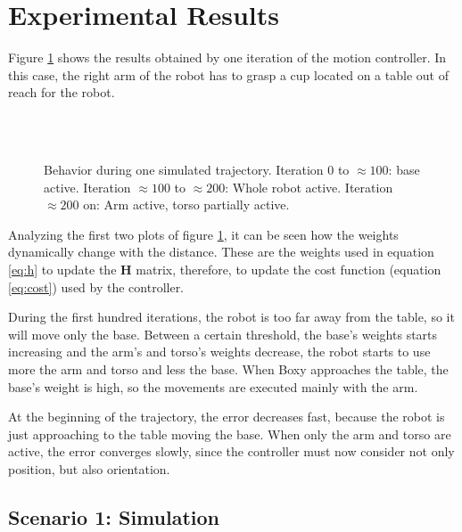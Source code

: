 \section{Experimental Results}

Figure \ref{fig:exp} shows the results obtained by one iteration of the motion controller. In this case, the right arm of the robot has to grasp a cup located on a table out of reach for the robot.

\begin{figure}[H]
	\centering
	 \\ \vspace{-10pt}
	 \\ \vspace{-5pt}
	 \vspace{-8pt}
	 \vspace{-5pt}
	 \vspace{-20pt}
	\caption[Trajectory Result]{Behavior during one simulated trajectory. Iteration $0$ to $\approx100$: base active. Iteration $\approx100$ to $\approx200$: Whole robot active. Iteration $\approx200$ on: Arm active, torso partially active.} \vspace{-15pt} \label{fig:exp}
\end{figure}

Analyzing  the first two plots of figure \ref{fig:exp}, it can be seen how the weights dynamically change with the distance. These are the weights used in equation \ref{eq:h} to update the $\textbf{H}$ matrix, therefore, to update the cost function (equation \ref{eq:cost}) used by the controller. 

During the first hundred iterations, the robot is too far away from the table, so it will move only the base. Between a certain threshold, the base's weights starts increasing and the arm's and torso's weights decrease, the robot starts to use more the arm and torso and less the base. When Boxy approaches the table, the base's weight is high, so the movements are executed mainly with the arm.

At the beginning of the trajectory, the error decreases fast, because the robot is just approaching to the table moving the base. When only the arm and torso are active, the error converges slowly, since the controller must now consider not only position, but also orientation.

\subsection{Scenario 1: Simulation}
\label{res:sim}

